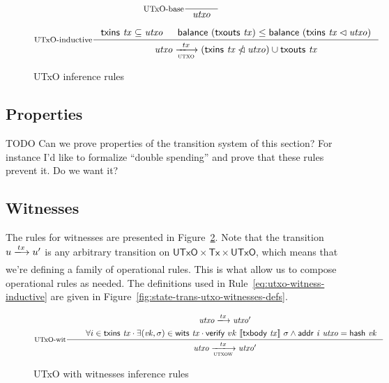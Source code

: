 \documentclass[11pt,a4paper]{article}
\newenvironment{todo}
  {\begin{bclogo}[logo=\bcoutil, couleur=red!5, couleurBarre=red, arrondi=0.2]{ TODO}}
  {\end{bclogo}}
\newcommand{\restrictdom}{\lhd}
\newcommand{\subtractdom}{\mathbin{\slashed{\restrictdom}}}
\newcommand{\var}[1]{\mathit{#1}}
\newcommand{\fun}[1]{\mathsf{#1}}
\newcommand{\type}[1]{\mathsf{#1}}
\newcommand{\trans}[2]{\xlongrightarrow[\textsc{#1}]{#2}}
\newcommand{\Tx}{\type{Tx}}
\newcommand{\UTxO}{\type{UTxO}}
\newcommand{\txins}[1]{\fun{txins}~ \var{#1}}
\newcommand{\txouts}[1]{\fun{txouts}~ \var{#1}}
\newcommand{\balance}[1]{\fun{balance}~ \var{#1}}
\newcommand{\wits}[1]{\fun{wits}~ \var{#1}}
\newcommand{\verify}[3]{\fun{verify} ~ #1 ~ #2 ~ #3}
\newcommand{\serialised}[1]{\llbracket \var{#1} \rrbracket}
\newcommand{\addr}[2]{\fun{addr}~ \var{#1}~ \var{#2}}
\newcommand{\hash}[1]{\fun{hash}~ \var{#1}}
\newcommand{\txbody}[1]{\fun{txbody}~ \var{#1}}
\begin{document}
\begin{figure}

  \centering
  \begin{equation}\label{eq:utxo-base}
    \inference[UTxO-base]
    {}
    {\var{utxo}}
  \end{equation}

  \begin{equation}\label{eq:utxo-inductive}
    \inference[UTxO-inductive]
    { \txins{tx} \subseteq \var{utxo}
      & \balance{(\txouts{tx})} \leq \balance{(\txins{tx} \restrictdom \var{utxo})}
    }
    {\var{utxo} \trans{utxo}{tx}
      (\txins{tx} \subtractdom \var{utxo}) \cup \txouts{tx}
    }
  \end{equation}
  \caption{UTxO inference rules}
  \label{fig:state-trans-utxo}
\end{figure}

\subsection{Properties}
\label{sec:utxo-properties}


\begin{todo}
  Can we prove properties of the transition system of this section? For
  instance I'd like to formalize ``double spending'' and prove that these rules
  prevent it. Do we want it?
\end{todo}

\subsection{Witnesses}
\label{sec:witnesses}

The rules for witnesses are presented in Figure~\ref{fig:rules-utxo-witnesses}.
Note that the transition $u \trans{}{tx} u'$ is any arbitrary transition on
$\UTxO \times \Tx \times \UTxO$, which means that we're defining a family of
operational rules. This is what allow us to compose operational rules as
needed. The definitions used in Rule~\ref{eq:utxo-witness-inductive} are given
in Figure~\ref{fig:state-trans-utxo-witnesses-defs}.

\begin{figure}
  \begin{equation}
    \label{eq:utxo-witness-inductive}
    \inference[UTxO-wit]
    { \var{utxo} \trans{}{tx} \var{utxo'}\\
      & \forall i \in \txins{tx} \cdot
           \exists (\var{vk}, \sigma) \in \wits{\var{tx}} \cdot
              \verify{vk}{\serialised{\txbody{tx}}}{\sigma}  \wedge \addr{i}{utxo} = \hash{vk}
    }
    {\var{utxo} \trans{utxow}{tx} \var{utxo'}}
  \end{equation}
  \caption{UTxO with witnesses inference rules}
  \label{fig:rules-utxo-witnesses}
\end{figure}
\end{document}
